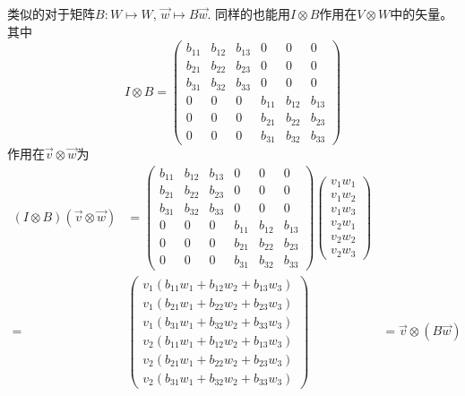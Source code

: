 \documentclass[a4paper,11pt]{article}
\begin{document}
    类似的对于矩阵$B:W\mapsto W$, $\vec{w}\mapsto B\vec{w}$. 同样的也能用$I\otimes B$作用在$V\otimes W$中的矢量。其中
    \begin{equation}
        I \otimes B=\left(\begin{array}{ccc|ccc}
            b_{11} & b_{12} & b_{13} & 0 & 0 & 0 \\
            b_{21} & b_{22} & b_{23} & 0 & 0 & 0 \\
            b_{31} & b_{32} & b_{33} & 0 & 0 & 0 \\
            \hline 0 & 0 & 0 & b_{11} & b_{12} & b_{13} \\
            0 & 0 & 0 & b_{21} & b_{22} & b_{23} \\
            0 & 0 & 0 & b_{31} & b_{32} & b_{33}
            \end{array}\right)
    \end{equation}
    作用在$\vec{v}\otimes\vec{w}$为
    \begin{equation}
        \begin{aligned}
            (I \otimes B)(\vec{v} \otimes \vec{w}) &=\left(\begin{array}{ccc|ccc}
            b_{11} & b_{12} & b_{13} & 0 & 0 & 0 \\
            b_{21} & b_{22} & b_{23} & 0 & 0 & 0 \\
            b_{31} & b_{32} & b_{33} & 0 & 0 & 0 \\
            \hline 0 & 0 & 0 & b_{11} & b_{12} & b_{13} \\
            0 & 0 & 0 & b_{21} & b_{22} & b_{23} \\
            0 & 0 & 0 & b_{31} & b_{32} & b_{33}
            \end{array}\right)\left(\begin{array}{c}
            v_{1} w_{1} \\
            v_{1} w_{2} \\
            v_{1} w_{3} \\
            \hline v_{2} w_{1} \\
            v_{2} w_{2} \\
            v_{2} w_{3}
            \end{array}\right) \\
            =&\left(\begin{array}{c}
            v_{1}\left(b_{11} w_{1}+b_{12} w_{2}+b_{13} w_{3}\right) \\
            v_{1}\left(b_{21} w_{1}+b_{22} w_{2}+b_{23} w_{3}\right) \\
            v_{1}\left(b_{31} w_{1}+b_{32} w_{2}+b_{33} w_{3}\right) \\
            \hline v_{2}\left(b_{11} w_{1}+b_{12} w_{2}+b_{13} w_{3}\right) \\
            v_{2}\left(b_{21} w_{1}+b_{22} w_{2}+b_{23} w_{3}\right) \\
            v_{2}\left(b_{31} w_{1}+b_{32} w_{2}+b_{33} w_{3}\right)
            \end{array}\right) &=\vec{v} \otimes(B \vec{w})
            \end{aligned}
    \end{equation}
\end{document}
